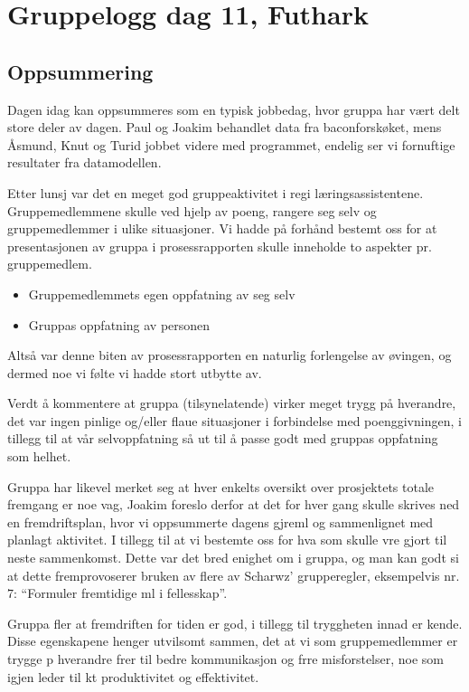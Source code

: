\documentclass[a4paper, norsk, 12pt]{report}
\begin{document}
\chapter*{Gruppelogg dag 11, Futhark}

\section*{Oppsummering}

Dagen idag kan oppsummeres som en typisk jobbedag, hvor gruppa har vært delt
store deler av dagen. Paul og Joakim behandlet data fra baconforskøket, mens
Åsmund, Knut og Turid jobbet videre med programmet, endelig ser vi fornuftige
resultater fra datamodellen.

Etter lunsj var det en meget god gruppeaktivitet i regi læringsassistentene.
Gruppemedlemmene skulle ved hjelp av poeng, rangere seg selv og gruppemedlemmer
i ulike situasjoner. Vi hadde på forhånd bestemt oss for at presentasjonen av
gruppa i prosessrapporten skulle inneholde to aspekter pr. gruppemedlem.
\begin{itemize}
\item Gruppemedlemmets egen oppfatning av seg selv
\item Gruppas oppfatning av personen
\end{itemize}
Altså var denne biten av prosessrapporten en naturlig forlengelse av øvingen, og
dermed noe vi følte vi hadde stort utbytte av.

Verdt å kommentere at gruppa (tilsynelatende) virker meget trygg på hverandre,
det var ingen pinlige og/eller flaue situasjoner i forbindelse med
poenggivningen, i tillegg til at vår selvoppfatning så ut til å passe godt med
gruppas oppfatning som helhet.

Gruppa har likevel merket seg at hver enkelts oversikt over prosjektets totale
fremgang er noe vag, Joakim foreslo derfor at det for hver gang skulle skrives
ned en fremdriftsplan, hvor vi oppsummerte dagens gjreml og sammenlignet med
planlagt aktivitet. I tillegg til at vi bestemte oss for hva som skulle vre
gjort til neste sammenkomst. Dette var det bred enighet om i gruppa, og man kan
godt si at dette fremprovoserer bruken av flere av Scharwz' grupperegler,
eksempelvis nr. $7$: ``Formuler fremtidige ml i fellesskap''.

Gruppa fler at fremdriften for tiden er god, i tillegg til tryggheten innad er
kende. Disse egenskapene henger utvilsomt sammen, det at vi som gruppemedlemmer
er trygge p hverandre frer til bedre kommunikasjon og frre misforstelser,
noe som igjen leder til kt produktivitet og effektivitet.
\end{document}
